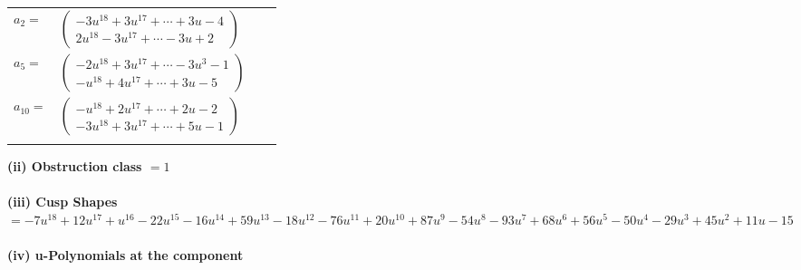 \documentclass[1p]{elsarticle_modified}
\theoremstyle{definition}
\begin{document}
\begin{tabular}{m{7pt} m{180pt} m{7pt} m{180pt} }
\flushright $a_{2}=$&$\begin{pmatrix}-3 u^{18}+3 u^{17}+\cdots+3 u-4\\2 u^{18}-3 u^{17}+\cdots-3 u+2\end{pmatrix}$ \\
\flushright $a_{5}=$&$\begin{pmatrix}-2 u^{18}+3 u^{17}+\cdots-3 u^3-1\\- u^{18}+4 u^{17}+\cdots+3 u-5\end{pmatrix}$ \\
\flushright $a_{10}=$&$\begin{pmatrix}- u^{18}+2 u^{17}+\cdots+2 u-2\\-3 u^{18}+3 u^{17}+\cdots+5 u-1\end{pmatrix}$\\&\end{tabular}
\flushleft \textbf{(ii) Obstruction class $= 1$}\\~\\
\flushleft \textbf{(iii) Cusp Shapes $= -7 u^{18}+12 u^{17}+u^{16}-22 u^{15}-16 u^{14}+59 u^{13}-18 u^{12}-76 u^{11}+20 u^{10}+87 u^9-54 u^8-93 u^7+68 u^6+56 u^5-50 u^4-29 u^3+45 u^2+11 u-15$}\\~\\
\newpage\renewcommand{\arraystretch}{1}
\flushleft \textbf{(iv) u-Polynomials at the component}\newline \\
\end{document}
